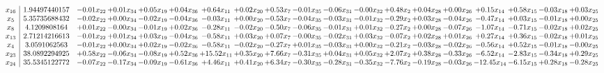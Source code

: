 \documentclass[9pt]{article}
\begin{document}
 \[\begin{array}{c| c c@{\hskip 2pt} c@{\hskip 2pt} c@{\hskip 2pt} c@{\hskip 2pt} c@{\hskip 2pt} c@{\hskip 2pt} c@{\hskip 2pt} c@{\hskip 2pt} c@{\hskip 2pt} c@{\hskip 2pt} c@{\hskip 2pt} c@{\hskip 2pt} c@{\hskip 2pt} c@{\hskip 2pt} c@{\hskip 2pt} c@{\hskip 2pt} c@{\hskip 2pt} }
 x_{16}   &  1.94497440157 & -0.01 x_{22} & +  0.01 x_{34} & +  0.05 x_{19} & +  0.04 x_{36} & +  0.64 x_{11} & +  0.02 x_{20} & +  0.53 x_{7} & -0.01 x_{35} & -0.06 x_{31} & -0.00 x_{32} & +  0.48 x_{2} & +  0.04 x_{28} & +  0.00 x_{26} & +  0.15 x_{14} & +  0.58 x_{15} & -0.03 x_{18} & +  0.03 x_{25}\\
 x_{5}   &  5.35735688432 & -0.02 x_{22} & +  0.00 x_{34} & -0.02 x_{19} & -0.04 x_{36} & -0.03 x_{11} & +  0.00 x_{20} & -0.53 x_{7} & -0.04 x_{35} & -0.03 x_{31} & -0.01 x_{32} & -0.29 x_{2} & +  0.03 x_{28} & -0.04 x_{26} & -0.47 x_{14} & +  0.03 x_{15} & -0.01 x_{18} & +  0.00 x_{25}\\
 x_{8}   &  4.1209808164 & +  0.01 x_{22} & -0.00 x_{34} & -0.01 x_{19} & +  0.02 x_{36} & -0.28 x_{11} & -0.02 x_{20} & -0.50 x_{7} & -0.06 x_{35} & -0.01 x_{31} & +  0.01 x_{32} & -0.27 x_{2} & +  0.00 x_{28} & -0.07 x_{26} & -1.07 x_{14} & -0.71 x_{15} & -0.02 x_{18} & +  0.02 x_{25}\\
 x_{13}   &  2.71214216613 & -0.01 x_{22} & +  0.01 x_{34} & +  0.03 x_{19} & -0.04 x_{36} & -0.58 x_{11} & +  0.03 x_{20} & +  0.07 x_{7} & -0.00 x_{35} & -0.02 x_{31} & +  0.03 x_{32} & -0.07 x_{2} & +  0.02 x_{28} & +  0.01 x_{26} & +  0.27 x_{14} & +  0.36 x_{15} & -0.02 x_{18} & +  0.01 x_{25}\\
 x_{4}   &  3.0591062563 & -0.01 x_{22} & +  0.00 x_{34} & +  0.02 x_{19} & -0.02 x_{36} & -0.58 x_{11} & -0.02 x_{20} & -0.27 x_{7} & +  0.01 x_{35} & -0.03 x_{31} & +  0.00 x_{32} & -0.21 x_{2} & -0.03 x_{28} & -0.02 x_{26} & -0.56 x_{14} & +  0.52 x_{15} & -0.01 x_{18} & -0.00 x_{25}\\
 x_{23}   &  38.0892294925 & +  0.58 x_{22} & -0.06 x_{34} & -0.08 x_{19} & +  0.52 x_{36} & + 15.52 x_{11} & +  0.35 x_{20} & +  7.66 x_{7} & -0.31 x_{35} & +  0.04 x_{31} & +  0.05 x_{32} & +  2.07 x_{2} & +  0.38 x_{28} & -0.33 x_{26} & -6.52 x_{14} & -2.83 x_{15} & -0.34 x_{18} & +  0.29 x_{25}\\
 x_{24}   &  35.5345122772 & -0.07 x_{22} & -0.17 x_{34} & -0.09 x_{19} & -0.61 x_{36} & +  4.46 x_{11} & +  0.41 x_{20} & +  6.34 x_{7} & -0.30 x_{35} & -0.28 x_{31} & -0.35 x_{32} & -7.76 x_{2} & -0.19 x_{28} & -0.03 x_{26} & -12.45 x_{14} & -6.15 x_{15} & +  0.28 x_{18} & -0.28 x_{25}\\

\end{array}\]
\end{document}
